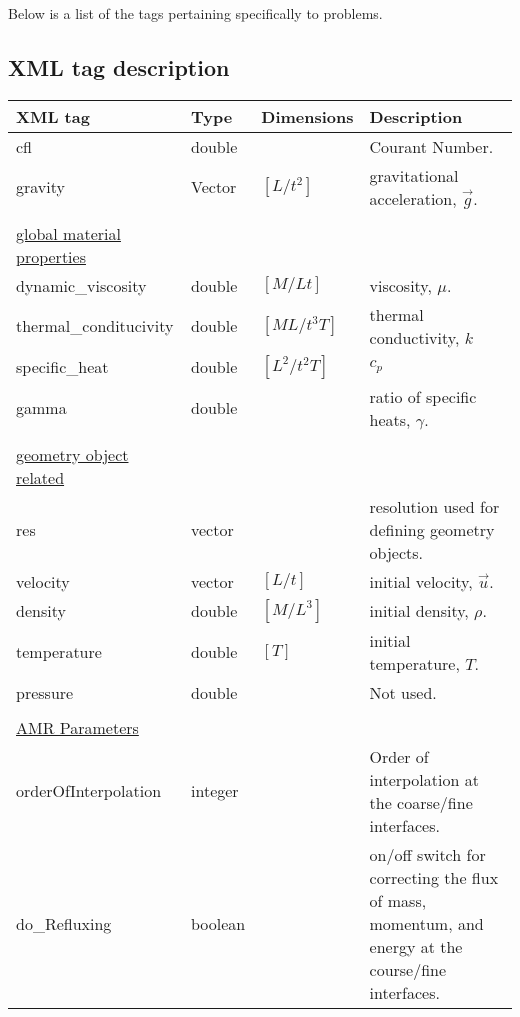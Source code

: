\newpage
Below is a list of the  tags pertaining specifically to  problems.

\subsection{XML tag description}
\begin {center}
\scriptsize
\begin{tabular}{lllp{8cm}}
XML tag & Type & Dimensions & Description\\
\hline
\hline
cfl                   & double &               &    Courant Number.\\
gravity               & Vector & $[L/t^2]$     &    gravitational acceleration, $\vec{g}$.\\
\\
\underline{\footnotesize{global material properties}} & & &\\
dynamic\_viscosity    & double & $[M/Lt]$      &    viscosity, $\mu$.\\
thermal\_conditucivity& double & $[ML/t^3T]$   &    thermal conductivity, $k$\\
specific\_heat        & double & $[L^2/t^2 T]$ &   $c_p$\\
gamma                 & double &               &    ratio of specific heats, $\gamma$.\\
\\
\underline{\footnotesize{geometry object related}} & & &\\
res                   & vector &               &    resolution used for defining geometry objects.\\
velocity              & vector & $[L/t]$       &    initial velocity, $\vec{u}$.\\
density               & double & $[M/L^3]$     &    initial density, $\rho$.\\
temperature           & double & $[T]$         &    initial temperature, $T$.\\
pressure              & double &               &    Not used. \\
\\
\underline{\footnotesize{AMR Parameters}} & & & \\
orderOfInterpolation  & integer &              &    Order of interpolation at the coarse/fine interfaces. \\
do\_Refluxing         & boolean &              &    on/off switch for correcting the flux of mass, momentum, and energy at the
                                                    course/fine interfaces.\\
\hline
\end{tabular}
\end{center}


